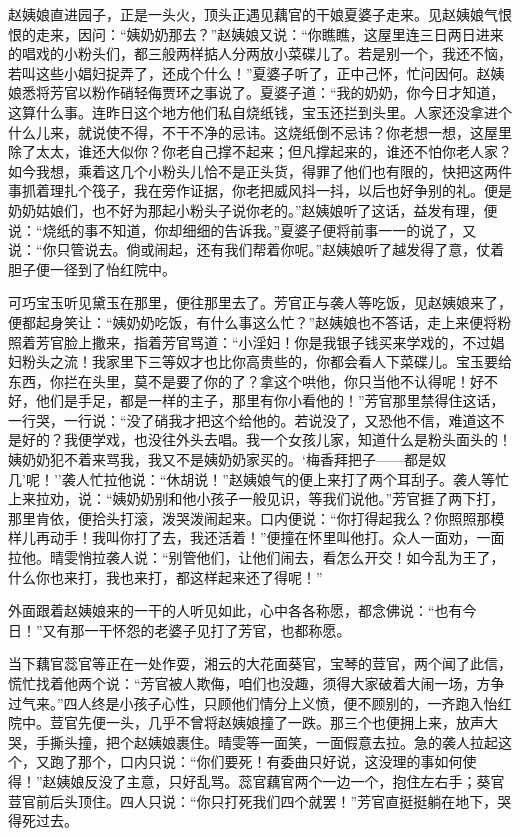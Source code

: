 赵姨娘直进园子，正是一头火，顶头正遇见藕官的干娘夏婆子走来。见赵姨娘气恨恨的走来，因问：``姨奶奶那去？''赵姨娘又说：``你瞧瞧，这屋里连三日两日进来的唱戏的小粉头们，都三般两样掂人分两放小菜碟儿了。若是别一个，我还不恼，若叫这些小娼妇捉弄了，还成个什么！''夏婆子听了，正中己怀，忙问因何。赵姨娘悉将芳官以粉作硝轻侮贾环之事说了。夏婆子道：``我的奶奶，你今日才知道，这算什么事。连昨日这个地方他们私自烧纸钱，宝玉还拦到头里。人家还没拿进个什么儿来，就说使不得，不干不净的忌讳。这烧纸倒不忌讳？你老想一想，这屋里除了太太，谁还大似你？你老自己撑不起来；但凡撑起来的，谁还不怕你老人家？如今我想，乘着这几个小粉头儿恰不是正头货，得罪了他们也有限的，快把这两件事抓着理扎个筏子，我在旁作证据，你老把威风抖一抖，以后也好争别的礼。便是奶奶姑娘们，也不好为那起小粉头子说你老的。''赵姨娘听了这话，益发有理，便说：``烧纸的事不知道，你却细细的告诉我。''夏婆子便将前事一一的说了，又说：``你只管说去。倘或闹起，还有我们帮着你呢。''赵姨娘听了越发得了意，仗着胆子便一径到了怡红院中。

可巧宝玉听见黛玉在那里，便往那里去了。芳官正与袭人等吃饭，见赵姨娘来了，便都起身笑让：``姨奶奶吃饭，有什么事这么忙？''赵姨娘也不答话，走上来便将粉照着芳官脸上撒来，指着芳官骂道：``小淫妇！你是我银子钱买来学戏的，不过娼妇粉头之流！我家里下三等奴才也比你高贵些的，你都会看人下菜碟儿。宝玉要给东西，你拦在头里，莫不是要了你的了？拿这个哄他，你只当他不认得呢！好不好，他们是手足，都是一样的主子，那里有你小看他的！''芳官那里禁得住这话，一行哭，一行说：``没了硝我才把这个给他的。若说没了，又恐他不信，难道这不是好的？我便学戏，也没往外头去唱。我一个女孩儿家，知道什么是粉头面头的！姨奶奶犯不着来骂我，我又不是姨奶奶家买的。`梅香拜把子------都是奴几'呢！''袭人忙拉他说：``休胡说！''赵姨娘气的便上来打了两个耳刮子。袭人等忙上来拉劝，说：``姨奶奶别和他小孩子一般见识，等我们说他。''芳官捱了两下打，那里肯依，便拾头打滚，泼哭泼闹起来。口内便说：``你打得起我么？你照照那模样儿再动手！我叫你打了去，我还活着！''便撞在怀里叫他打。众人一面劝，一面拉他。晴雯悄拉袭人说：``别管他们，让他们闹去，看怎么开交！如今乱为王了，什么你也来打，我也来打，都这样起来还了得呢！''

外面跟着赵姨娘来的一干的人听见如此，心中各各称愿，都念佛说：``也有今日！''又有那一干怀怨的老婆子见打了芳官，也都称愿。

当下藕官蕊官等正在一处作耍，湘云的大花面葵官，宝琴的荳官，两个闻了此信，慌忙找着他两个说：``芳官被人欺侮，咱们也没趣，须得大家破着大闹一场，方争过气来。''四人终是小孩子心性，只顾他们情分上义愤，便不顾别的，一齐跑入怡红院中。荳官先便一头，几乎不曾将赵姨娘撞了一跌。那三个也便拥上来，放声大哭，手撕头撞，把个赵姨娘裹住。晴雯等一面笑，一面假意去拉。急的袭人拉起这个，又跑了那个，口内只说：``你们要死！有委曲只好说，这没理的事如何使得！''赵姨娘反没了主意，只好乱骂。蕊官藕官两个一边一个，抱住左右手；葵官荳官前后头顶住。四人只说：``你只打死我们四个就罢！''芳官直挺挺躺在地下，哭得死过去。

